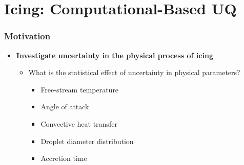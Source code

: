 \documentclass[9pt]{beamer}
\begin{document}
\section{Icing: Computational-Based UQ}
\label{sec-3}
\begin{frame}
\frametitle{Motivation}
\label{sec-3-1}

\begin{itemize}
\item \textbf{Investigate uncertainty in the physical process of icing}
\begin{itemize}
\item What is the statistical effect of uncertainty in physical parameters?
\begin{itemize}
\item Free-stream temperature
\item Angle of attack
\item Convective heat transfer
\item Droplet diameter distribution
\item Accretion time
\end{itemize}
\end{itemize}
\end{itemize}
\end{frame}
\end{document}
